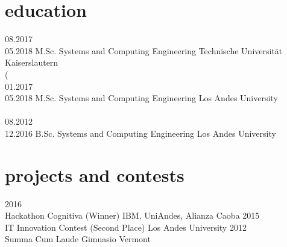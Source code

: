 \documentclass[english]{cv-style}          %
\begin{document}
 {\vspace{-0.5cm}}
\section{education}

\begin{entrylist}
\entry
{08.2017\\05.2018}
{M.Sc. Systems and Computing Engineering}
{Technische Universität Kaiserslautern}
{\\
(\\
{\vspace{-0.3cm}}}
\entry
{01.2017\\05.2018}
{M.Sc. Systems and Computing Engineering}
{Los Andes University}
{\\
\normalfont{[GPA 4.30]}\\
{\vspace{-0.3cm}}}
\entry
{08.2012\\12.2016}
{B.Sc. Systems and Computing Engineering}
{Los Andes University}
{\normalfont{[GPA 4.08]}\\
{\vspace{-0.3cm}}}
\end{entrylist}

 {\vspace{-0.5cm}}
\section{projects and contests}

\begin{entrylist}
\entry
{2016\\\vspace{-0.3cm}}
{Hackathon Cognitiva (Winner)}
{IBM, UniAndes, Alianza Caoba}
{\vspace{-0.3cm}}
\entry
{2015\\\vspace{-0.3cm}}
{IT Innovation Contest (Second Place)}
{Los Andes University}
{\vspace{-0.3cm}}
\entry
{2012\\\vspace{-0.5cm}}
{Summa Cum Laude}
{Gimnasio Vermont}
{\vspace{-1cm}}
\end{entrylist}
{\vspace{-0.1cm}}
\end{document}
